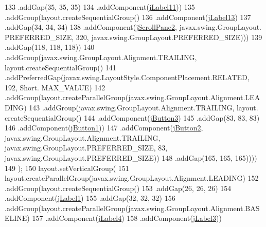 \begin{DoxyCode}
133                                 .addGap(35, 35, 35)
134                                 .addComponent(\mbox{\hyperlink{classsoftware_1_1validornotvalid_aa639ffbcb05919b5b8be27b096c874da}{jLabel11}}))
135                             .addGroup(layout.createSequentialGroup()
136                                 .addComponent(\mbox{\hyperlink{classsoftware_1_1validornotvalid_abaafc4b5c74ef3845c0469f1bf1ae5eb}{jLabel13}})
137                                 .addGap(34, 34, 34)
138                                 .addComponent(\mbox{\hyperlink{classsoftware_1_1validornotvalid_afbe433c154dcca4c8d5a9c0714485d8e}{jScrollPane2}}, javax.swing.GroupLayout.
      PREFERRED\_SIZE, 320, javax.swing.GroupLayout.PREFERRED\_SIZE)))
139                         .addGap(118, 118, 118))
140                     .addGroup(javax.swing.GroupLayout.Alignment.TRAILING, layout.createSequentialGroup()
141                         .addPreferredGap(javax.swing.LayoutStyle.ComponentPlacement.RELATED, 192, Short.
      MAX\_VALUE)
142                         .addGroup(layout.createParallelGroup(javax.swing.GroupLayout.Alignment.LEADING)
143                             .addGroup(javax.swing.GroupLayout.Alignment.TRAILING, layout.
      createSequentialGroup()
144                                 .addComponent(\mbox{\hyperlink{classsoftware_1_1validornotvalid_ab48fb28356cce2216dcac1cb0131624c}{jButton3}})
145                                 .addGap(83, 83, 83)
146                                 .addComponent(\mbox{\hyperlink{classsoftware_1_1validornotvalid_a4322ace1270f409aa8ada36dd8fde2e5}{jButton1}}))
147                             .addComponent(\mbox{\hyperlink{classsoftware_1_1validornotvalid_a18b41fd0e21eac702ca4a03b9a10285b}{jButton2}}, javax.swing.GroupLayout.Alignment.TRAILING, 
      javax.swing.GroupLayout.PREFERRED\_SIZE, 83, javax.swing.GroupLayout.PREFERRED\_SIZE))
148                         .addGap(165, 165, 165))))
149         );
150         layout.setVerticalGroup(
151             layout.createParallelGroup(javax.swing.GroupLayout.Alignment.LEADING)
152             .addGroup(layout.createSequentialGroup()
153                 .addGap(26, 26, 26)
154                 .addComponent(\mbox{\hyperlink{classsoftware_1_1validornotvalid_ad6cb9e904f7cb7d49c96c66285d81f2f}{jLabel1}})
155                 .addGap(32, 32, 32)
156                 .addGroup(layout.createParallelGroup(javax.swing.GroupLayout.Alignment.BASELINE)
157                     .addComponent(\mbox{\hyperlink{classsoftware_1_1validornotvalid_a8e62567b7da0a8b4c83016569d52963e}{jLabel4}})
158                     .addComponent(\mbox{\hyperlink{classsoftware_1_1validornotvalid_a7b2e42b02447e6b29b0c4626ee773c0d}{jLabel3}}))

\end{DoxyCode}
